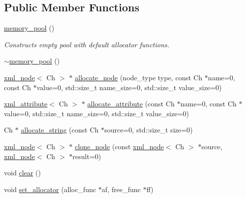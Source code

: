 \subsection*{Public Member Functions}
\begin{DoxyCompactItemize}
\item 
\hypertarget{classrapidxml_1_1memory__pool_a0b609da81dff28a19ebd704400788429}{\hyperlink{classrapidxml_1_1memory__pool_a0b609da81dff28a19ebd704400788429}{memory\-\_\-pool} ()}\label{classrapidxml_1_1memory__pool_a0b609da81dff28a19ebd704400788429}

\begin{DoxyCompactList}\small\item\em Constructs empty pool with default allocator functions. \end{DoxyCompactList}\item 
\hyperlink{classrapidxml_1_1memory__pool_a0a3e82126e59e4077f41e933130bb5a0}{$\sim$memory\-\_\-pool} ()
\item 
\hyperlink{classrapidxml_1_1xml__node}{xml\-\_\-node}$<$ Ch $>$ $\ast$ \hyperlink{classrapidxml_1_1memory__pool_a4118581c29ee9a2f6b55ebf7dac185f8}{allocate\-\_\-node} (node\-\_\-type type, const Ch $\ast$name=0, const Ch $\ast$value=0, std\-::size\-\_\-t name\-\_\-size=0, std\-::size\-\_\-t value\-\_\-size=0)
\item 
\hyperlink{classrapidxml_1_1xml__attribute}{xml\-\_\-attribute}$<$ Ch $>$ $\ast$ \hyperlink{classrapidxml_1_1memory__pool_a3de2a66c983336e006ea3844e244ed30}{allocate\-\_\-attribute} (const Ch $\ast$name=0, const Ch $\ast$value=0, std\-::size\-\_\-t name\-\_\-size=0, std\-::size\-\_\-t value\-\_\-size=0)
\item 
Ch $\ast$ \hyperlink{classrapidxml_1_1memory__pool_a171941b39d55b868358da97462185f58}{allocate\-\_\-string} (const Ch $\ast$source=0, std\-::size\-\_\-t size=0)
\item 
\hyperlink{classrapidxml_1_1xml__node}{xml\-\_\-node}$<$ Ch $>$ $\ast$ \hyperlink{classrapidxml_1_1memory__pool_a0a10679fc17597d339a0dc107f8a94ac}{clone\-\_\-node} (const \hyperlink{classrapidxml_1_1xml__node}{xml\-\_\-node}$<$ Ch $>$ $\ast$source, \hyperlink{classrapidxml_1_1xml__node}{xml\-\_\-node}$<$ Ch $>$ $\ast$result=0)
\item 
void \hyperlink{classrapidxml_1_1memory__pool_aad377c835fdaed1cb2cc9df194cf84e4}{clear} ()
\item 
void \hyperlink{classrapidxml_1_1memory__pool_a84d3d8d2cdfc00501e1dcf26d889ae03}{set\-\_\-allocator} (alloc\-\_\-func $\ast$af, free\-\_\-func $\ast$ff)
\end{DoxyCompactItemize}


